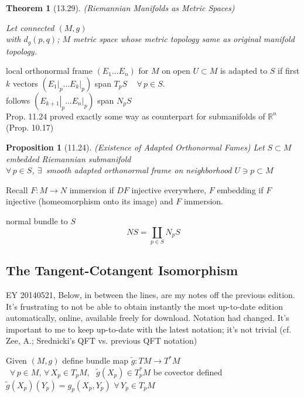 \documentclass[11pt]{amsart}
\newtheorem{theorem}{Theorem}
\newtheorem{proposition}{Proposition}
\theoremstyle{definition}
\begin{document}
\begin{theorem}[13.29] (Riemannian Manifolds as Metric Spaces)

Let connected $(M,g)$ \\
with $d_g(p,q)$; $M$ metric space whose metric topology same as original manifold topology.
\end{theorem}




local orthonormal frame $(E_1 \dots E_n)$ for $M$ on open $U\subset M$ is adapted to $S$ if first $k$ vectors $( \left. E_1 \right|_p \dots \left. E_k \right|_p)$ span $T_pS \quad \, \forall \, p \in S$. \\
\quad follows $( \left. E_{k+1} \right|_p \dots \left. E_n \right|_p )$ span $N_pS$ \\

Prop. 11.24 proved exactly some way as counterpart for submanifolds of $\mathbb{R}^n$ (Prop. 10.17)

\begin{proposition}[11.24] (Existence of Adapted Orthonormal Fames)
Let $S\subset M$ embedded Riemannian submanifold  \\
\quad $\forall \, p \in S$, $\exists \, $ smooth adapted orthonormal frame on neighborhood $U \ni p \subset M$
\end{proposition}

Recall $F:M \to N$ immersion if $DF$ injective everywhere, $F$ embedding if $F$ injective (homeomorphism onto its image) and $F$ immersion.


normal bundle to $S$
\[
NS  = \coprod_{p \in S} N_p S
\]



\subsection*{The Tangent-Cotangent Isomorphism}

EY 20140521, Below, in between the lines, are my notes off the previous edition.  It's frustrating to not be able to obtain instantly the most up-to-date edition automatically, online, available freely for download.  Notation had changed.  It's important to me to keep up-to-date with the latest notation; it's not trivial (cf. Zee, A.; Srednicki's QFT vs. previous QFT notation)

\hrulefill

Given $(M,g)$ define bundle map $\widetilde{g}:TM \to T^*M$ \\
\quad \, $\forall \, p \in M$, $\forall \, X_p \in T_pM$, \, $\widetilde{g}(X_p) \in T_p^*M$ be covector defined $\widetilde{g}(X_p)(Y_p) = g_p(X_p,Y_p)$ \quad $\forall \, Y_p \in T_pM$ \\
\end{document}
